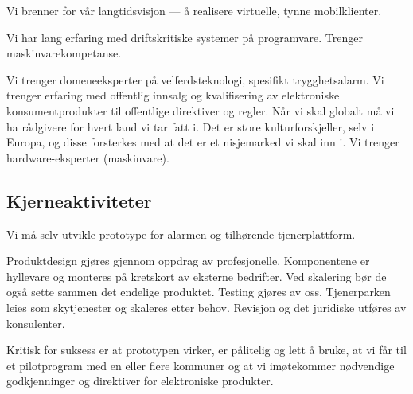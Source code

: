 Vi brenner for vår langtidsvisjon --- å realisere virtuelle, tynne
mobilklienter.

Vi har lang erfaring med driftskritiske systemer på programvare. Trenger
maskinvarekompetanse.%

Vi trenger domeneeksperter på velferdsteknologi, spesifikt trygghetsalarm. Vi
trenger erfaring med offentlig innsalg og kvalifisering av elektroniske
konsumentprodukter til offentlige direktiver og regler. Når vi skal globalt må
vi ha rådgivere for hvert land vi tar fatt i. Det er store kulturforskjeller,
selv i Europa, og disse forsterkes med at det er et nisjemarked vi skal inn i.
Vi trenger hardware-eksperter (maskinvare).




\subsection{Kjerneaktiviteter}


Vi må selv utvikle prototype for alarmen og tilhørende tjenerplattform.

Produktdesign gjøres gjennom oppdrag av profesjonelle. Komponentene er
hyllevare og monteres på kretskort av eksterne bedrifter. Ved skalering bør de
også sette sammen det endelige produktet. Testing gjøres av oss. Tjenerparken
leies som skytjenester og skaleres etter behov. Revisjon og det juridiske
utføres av konsulenter.

Kritisk for suksess er at prototypen virker, er pålitelig og lett å bruke, at vi
får til et pilotprogram med en eller flere kommuner og at vi imøtekommer
nødvendige godkjenninger og direktiver for elektroniske produkter.

